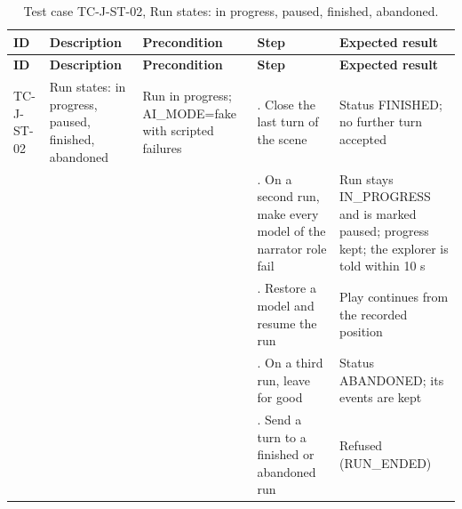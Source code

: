 {\small
\begin{longtable}{|>{\raggedright\arraybackslash}p{}|>{\raggedright\arraybackslash}p{}|>{\raggedright\arraybackslash}p{}|>{\raggedright\arraybackslash}p{}|>{\raggedright\arraybackslash}p{}|}
\caption{Test case TC-J-ST-02, Run states: in progress, paused, finished, abandoned.} \\
\hline
\textbf{ID} & \textbf{Description} & \textbf{Precondition} & \textbf{Step} & \textbf{Expected result} \\ \hline
\endfirsthead
\hline
\textbf{ID} & \textbf{Description} & \textbf{Precondition} & \textbf{Step} & \textbf{Expected result} \\ \hline
\endhead
TC-J-ST-02 & Run states: in progress, paused, finished, abandoned & Run in progress; AI\_MODE=fake with scripted failures & 1. Close the last turn of the scene & Status FINISHED; no further turn accepted \\ \hline
 &  &  & 2. On a second run, make every model of the narrator role fail & Run stays IN\_PROGRESS and is marked paused; progress kept; the explorer is told within 10 s \\ \hline
 &  &  & 3. Restore a model and resume the run & Play continues from the recorded position \\ \hline
 &  &  & 4. On a third run, leave for good & Status ABANDONED; its events are kept \\ \hline
 &  &  & 5. Send a turn to a finished or abandoned run & Refused (RUN\_ENDED) \\ \hline
\end{longtable}
}

